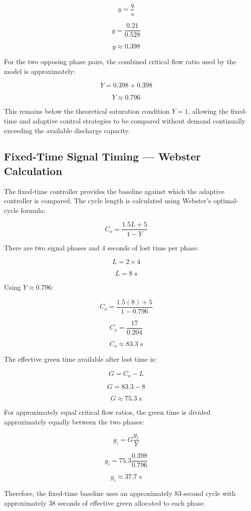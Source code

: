 \documentclass{article}
\begin{document}
$$
y=\frac{q}{s}
$$

$$
y=\frac{0.21}{0.528}
$$

$$
\boxed{y\approx0.398}
$$

For the two opposing phase pairs, the combined critical flow ratio used by the model is approximately:

$$
Y=0.398+0.398
$$

$$
\boxed{Y\approx0.796}
$$

This remains below the theoretical saturation condition \(Y=1\), allowing the fixed-time and adaptive control strategies to be compared without demand continually exceeding the available discharge capacity.

\subsection{Fixed-Time Signal Timing — Webster Calculation}

The fixed-time controller provides the baseline against which the adaptive controller is compared. The cycle length is calculated using Webster's optimal-cycle formula:

$$
C_o=\frac{1.5L+5}{1-Y}
$$

There are two signal phases and 4 seconds of lost time per phase:

$$
L=2\times4
$$

$$
\boxed{L=8\text{ s}}
$$

Using \(Y\approx0.796\):

$$
C_o=\frac{1.5(8)+5}{1-0.796}
$$

$$
C_o=\frac{17}{0.204}
$$

$$
\boxed{C_o\approx83.3\text{ s}}
$$

The effective green time available after lost time is:

$$
G=C_o-L
$$

$$
G=83.3-8
$$

$$
\boxed{G\approx75.3\text{ s}}
$$

For approximately equal critical flow ratios, the green time is divided approximately equally between the two phases:

$$
g_i=G\frac{y_i}{Y}
$$

$$
g_i=75.3\frac{0.398}{0.796}
$$

$$
\boxed{g_i\approx37.7\text{ s}}
$$

Therefore, the fixed-time baseline uses an approximately 83-second cycle with approximately 38 seconds of effective green allocated to each phase.
\end{document}
